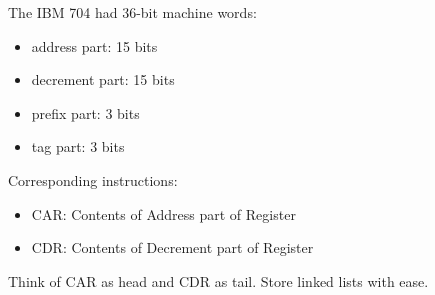 \documentclass[professionalFonts]{beamer}
\begin{document}
\begin{frame}

The IBM 704 had 36-bit machine words:

\begin{itemize}
\item address part: 15 bits
\item decrement part: 15 bits
\item prefix part: 3 bits
\item tag part: 3 bits
\end{itemize}

Corresponding instructions:

\begin{itemize}
\item CAR: Contents of Address part of Register
\item CDR: Contents of Decrement part of Register
\end{itemize}

Think of CAR as head and CDR as tail. Store linked lists with ease.

\end{frame}
\end{document}
